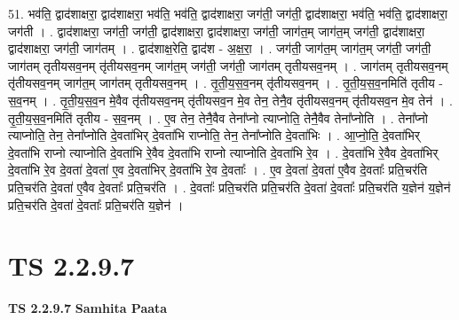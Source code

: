 \documentclass[17pt]{extarticle}
\begin{document}
51. भव॑ति॒ द्वाद॑शाक्षरा॒ द्वाद॑शाक्षरा॒ भव॑ति॒ भव॑ति॒ द्वाद॑शाक्षरा॒ जग॑ती॒ जग॑ती॒ द्वाद॑शाक्षरा॒ भव॑ति॒ भव॑ति॒ द्वाद॑शाक्षरा॒ जग॑ती । . द्वाद॑शाक्षरा॒ जग॑ती॒ जग॑ती॒ द्वाद॑शाक्षरा॒ द्वाद॑शाक्षरा॒ जग॑ती॒ जाग॑त॒म् जाग॑त॒म् जग॑ती॒ द्वाद॑शाक्षरा॒ द्वाद॑शाक्षरा॒ जग॑ती॒ जाग॑तम् । . द्वाद॑शाक्ष॒रेति॒ द्वाद॑श - अ॒क्ष॒रा॒ । . जग॑ती॒ जाग॑त॒म् जाग॑त॒म् जग॑ती॒ जग॑ती॒ जाग॑तम् तृतीयसव॒नम् तृ॑तीयसव॒नम् जाग॑त॒म् जग॑ती॒ जग॑ती॒ जाग॑तम् तृतीयसव॒नम् । . जाग॑तम् तृतीयसव॒नम् तृ॑तीयसव॒नम् जाग॑त॒म् जाग॑तम् तृतीयसव॒नम् । . तृ॒ती॒य॒स॒व॒नम् तृ॑तीयसव॒नम् । . तृ॒ती॒य॒स॒व॒नमिति॑ तृतीय - स॒व॒नम् । . तृ॒ती॒य॒स॒व॒न मे॒वैव तृ॑तीयसव॒नम् तृ॑तीयसव॒न मे॒व तेन॒ तेनै॒व तृ॑तीयसव॒नम् तृ॑तीयसव॒न मे॒व तेन॑ । . तृ॒ती॒य॒स॒व॒नमिति॑ तृतीय - स॒व॒नम् । . ए॒व तेन॒ तेनै॒वैव तेना᳚प्नो त्याप्नोति॒ तेनै॒वैव तेना᳚प्नोति । . तेना᳚प्नो त्याप्नोति॒ तेन॒ तेना᳚प्नोति दे॒वता॑भिर् दे॒वता॑भि राप्नोति॒ तेन॒ तेना᳚प्नोति दे॒वता॑भिः । . आ॒प्नो॒ति॒ दे॒वता॑भिर् दे॒वता॑भि राप्नो त्याप्नोति दे॒वता॑भि रे॒वैव दे॒वता॑भि राप्नो त्याप्नोति दे॒वता॑भि रे॒व । . दे॒वता॑भि रे॒वैव दे॒वता॑भिर् दे॒वता॑भि रे॒व दे॒वता॑ दे॒वता॑ ए॒व दे॒वता॑भिर् दे॒वता॑भि रे॒व दे॒वताः᳚ । . ए॒व दे॒वता॑ दे॒वता॑ ए॒वैव दे॒वताः᳚ प्रति॒चर॑ति प्रति॒चर॑ति दे॒वता॑ ए॒वैव दे॒वताः᳚ प्रति॒चर॑ति । . दे॒वताः᳚ प्रति॒चर॑ति प्रति॒चर॑ति दे॒वता॑ दे॒वताः᳚ प्रति॒चर॑ति य॒ज्ञेन॑ य॒ज्ञेन॑ प्रति॒चर॑ति दे॒वता॑ दे॒वताः᳚ प्रति॒चर॑ति य॒ज्ञेन॑ । \newline
\pagebreak
{}
\section*{ TS 2.2.9.7 }

\textbf{TS 2.2.9.7 } \newline
\textbf{Samhita Paata} \newline
\end{document}
